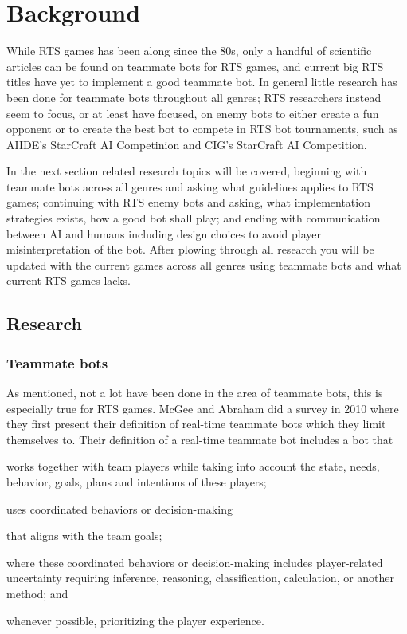 \chapter{Background}
While RTS games has been along since the 80s\cite{adams06, rtsHistory}, only a handful of scientific articles can be found on teammate bots for RTS games, and current big RTS titles have yet to implement a good teammate bot. In general little research has been done for teammate bots throughout all genres; RTS researchers instead seem to focus, or at least have focused, on enemy bots to either create a fun opponent
or to create the best bot to compete in RTS bot tournaments, such as  AIIDE's StarCraft AI Competinion\cite{scaiide} and CIG's StarCraft AI Competition\cite{sccig}.

In the next section related research topics will be covered, beginning with teammate bots across all genres and asking what guidelines applies to RTS games; continuing with RTS enemy bots and asking, what implementation strategies exists, how a good bot shall play; and ending with communication between AI and humans including design choices to avoid player misinterpretation of the bot. After plowing through all research you will be updated with the current games across all genres using teammate bots and what current RTS games lacks.


\section{Research}

\subsection{Teammate bots}
As mentioned, not a lot have been done in the area of teammate bots, this is especially true for RTS games. McGee and Abraham did a survey in 2010 where they first present their definition of real-time teammate bots which they limit themselves to\cite{mcgee10}. Their definition of a real-time teammate bot includes a bot that
\begin{inparaenum}[a\upshape)]
	\item works together with team players while taking into account the state, needs, behavior, goals, plans and intentions of these players;
	\item uses coordinated behaviors or decision-making
	\item that aligns with the team goals;
	\item where these coordinated behaviors or decision-making includes player-related uncertainty requiring inference, reasoning, classification, calculation, or another method; and
	\item whenever possible, prioritizing the player experience.
\end{inparaenum}

